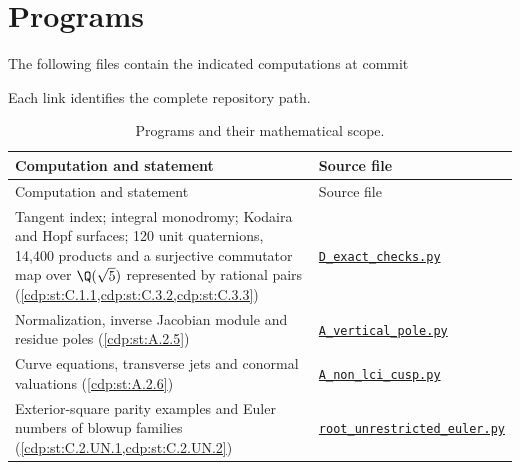 \section*{Programs}
The following files contain the indicated computations at commit
\begin{center}\small\ttfamily\SsixRepositoryCommit\end{center}
Each link identifies the complete repository path.

{\footnotesize
\renewcommand{\arraystretch}{.9}
\setlength{\tabcolsep}{4pt}
\begin{longtable}{@{}>{\raggedright\arraybackslash}p{}>{\raggedright\arraybackslash}p{}@{}}
\caption{Programs and their mathematical scope.}\label{tab:II:programs}\\
\toprule Computation and statement & Source file \\
\midrule\endfirsthead
\toprule Computation and statement & Source file \\
\midrule\endhead
\bottomrule\endfoot
Tangent index; integral monodromy; Kodaira and Hopf surfaces; 120 unit quaternions, 14,400 products and a surjective commutator map over $\Q(\sqrt5)$ represented by rational pairs (\cref{cdp:st:C.1.1,cdp:st:C.3.2,cdp:st:C.3.3}) & \href{https://raw.githubusercontent.com/KokunoYumeto/s6-complex-structure-workbench/\SsixRepositoryCommit/pro_returns/S6_03_CDP_checkpoint_13_20261116T0136Z/S6_03_CDP/code/D_exact_checks.py}{\nolinkurl{D_exact_checks.py}} \\[3pt]
Normalization, inverse Jacobian module and residue poles (\cref{cdp:st:A.2.5}) & \href{https://raw.githubusercontent.com/KokunoYumeto/s6-complex-structure-workbench/\SsixRepositoryCommit/pro_returns/S6_03_CDP_checkpoint_13_20261116T0136Z/S6_03_CDP/code/A_vertical_pole.py}{\nolinkurl{A_vertical_pole.py}} \\[3pt]
Curve equations, transverse jets and conormal valuations (\cref{cdp:st:A.2.6}) & \href{https://raw.githubusercontent.com/KokunoYumeto/s6-complex-structure-workbench/\SsixRepositoryCommit/pro_returns/S6_03_CDP_checkpoint_13_20261116T0136Z/S6_03_CDP/code/A_non_lci_cusp.py}{\nolinkurl{A_non_lci_cusp.py}} \\[3pt]
Exterior-square parity examples and Euler numbers of blowup families (\cref{cdp:st:C.2.UN.1,cdp:st:C.2.UN.2}) & \href{https://raw.githubusercontent.com/KokunoYumeto/s6-complex-structure-workbench/\SsixRepositoryCommit/pro_returns/S6_03_CDP_checkpoint_13_20261116T0136Z/S6_03_CDP/code/root_unrestricted_euler.py}{\nolinkurl{root_unrestricted_euler.py}} \\[3pt]
\end{longtable}}

